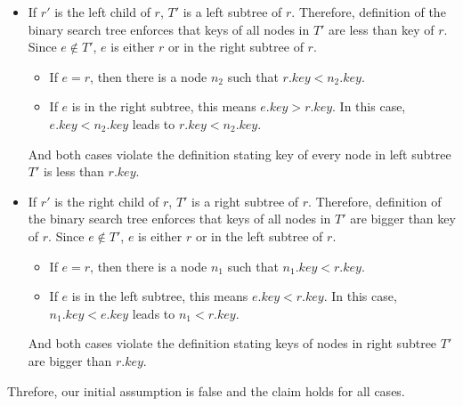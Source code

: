 \begin{itemize}[itemsep=1mm] \parskip=0pt \parsep=0pt
\item If $r'$ is the left child of $r$, $T'$ is a left subtree of $r$. Therefore, definition of the binary search tree enforces that keys of all nodes in $T'$ are less than key of $r$. Since $e \notin T'$, $e$ is either $r$ or in the right subtree of $r$.
\begin{itemize}[itemsep=1mm] \parskip=0pt \parsep=0pt
  \item[] If $e = r$, then there is a node $n_2$ such that $r.key < n_2.key$.
  \item[] If $e$ is in the right subtree, this means $e.key > r.key$. In this case, $e.key < n_2.key$ leads to $r.key < n_2.key$.
\end{itemize}
And both cases violate the definition stating key of every node in left subtree $T'$ is less than $r.key$.
\item If $r'$ is the right child of $r$, $T'$ is a right subtree of $r$. Therefore, definition of the binary search tree enforces that keys of all nodes in $T'$ are bigger than key of $r$. Since $e \notin T'$, $e$ is either $r$ or in the left subtree of $r$.
\begin{itemize}[itemsep=1mm] \parskip=0pt \parsep=0pt
  \item[] If $e = r$, then there is a node $n_1$ such that $n_1.key < r.key$.
  \item[] If $e$ is in the left subtree, this means $e.key < r.key$. In this case, $n_1.key < e.key$ leads to $n_1 < r.key$.
\end{itemize}
And both cases violate the definition stating keys of nodes in right subtree $T'$ are bigger than $r.key$.
\end{itemize}
Threfore, our initial assumption is false and the claim holds for all cases.
